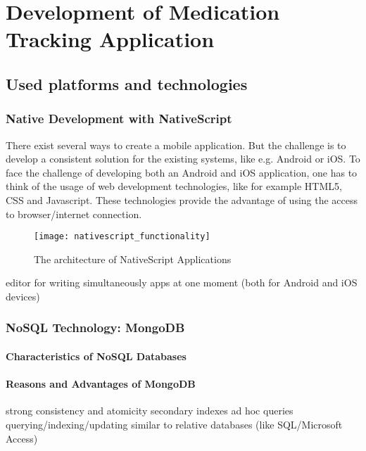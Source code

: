 \chapter{Development of Medication Tracking Application}
\label{Kap3}

\section{Used platforms and technologies} \label{platforms}

\subsection{Native Development with NativeScript} 

There exist several ways to create a mobile application. But the challenge is to develop a consistent solution for the existing systems, like e.g. Android or iOS.
To face the challenge of developing both an Android and iOS application, one has to think of the usage of web development technologies, like for example HTML5, CSS and Javascript. These technologies provide the advantage of using the access to browser/internet  connection.


\begin{figure}
\centering
\texttt{[image: nativescript\_functionality]}
\caption{\label{fig:nsarchitecture}The architecture of NativeScript Applications \cite{nsarchitecture}} 
\end{figure}



editor for writing simultaneously apps at one moment (both for Android and iOS devices)

\subsection{NoSQL Technology: MongoDB} \label{nosql}

\subsubsection{Characteristics of NoSQL Databases}

\subsubsection{Reasons and Advantages of MongoDB}

strong consistency and atomicity
secondary indexes 
ad hoc queries
querying/indexing/updating similar to relative databases (like SQL/Microsoft Access)

